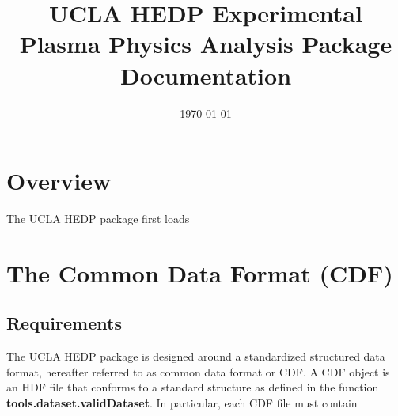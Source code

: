 \documentclass[12pt]{article}
\title{UCLA HEDP Experimental Plasma Physics Analysis Package Documentation}
\date{\today}
\newcommand{\loc}[1]{{\bf \fontfamily{pcr}\selectfont #1}}
\begin{document}
\maketitle

\newpage

\tableofcontents

\newpage

\section{Overview}

The UCLA HEDP package first loads 


\section{The Common Data Format (CDF)\label{cdf}}

\subsection{Requirements}

The UCLA HEDP package is designed around a standardized structured data format, hereafter referred to as common data format or CDF. A CDF object is an HDF file that conforms to a standard structure as defined in the function \loc{tools.dataset.validDataset}. In particular, each CDF file must contain
\end{document}
